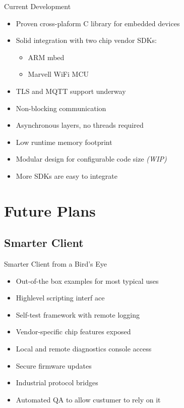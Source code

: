 \documentclass{beamer}
\begin{document}
\begin{frame}{Current Development}
\begin{itemize}
  \item Proven cross-plaform C library for embedded devices
  \item Solid integration with two chip vendor SDKs:
  \begin{itemize}
    \item ARM mbed
    \item Marvell WiFi MCU
  \end{itemize}
  \item TLS and MQTT support underway
  \item Non-blocking communication
  \item Asynchronous layers, no threads required
  \item Low runtime memory footprint
  \item Modular design for configurable code size \emph{(WIP)}
  \item More SDKs are easy to integrate
\end{itemize}
\end{frame}

\section{Future Plans}
\subsection{Smarter Client}

\begin{frame}{Smarter Client from a Bird's Eye}
\begin{itemize}
  \item Out-of-the box examples for most typical uses
  \item Highlevel scripting interf	ace
  \item Self-test framework with remote logging
  \item Vendor-specific chip features exposed
  \item Local and remote diagnostics console access
  \item Secure firmware updates
  \item Industrial protocol bridges
  \item Automated QA to allow custumer to rely on it
\end{itemize}
\end{frame}
\end{document}
